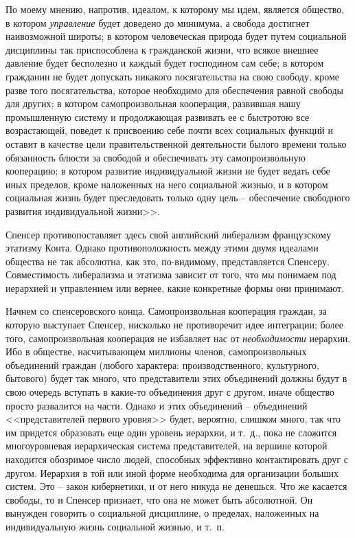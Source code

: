 \documentclass{book}
\begin{document}
По моему мнению, напротив, идеалом, к которому мы идем, является общество, в котором \textit{управление}  будет доведено до минимума, а свобода достигнет наивозможной широты; в ко­тором человеческая природа будет путем социальной дисцип­лины так приспособлена к гражданской жизни, что всякое внешнее давление будет бесполезно и каждый будет господи­ном сам себе; в котором гражданин не будет допускать ника­кого посягательства на свою свободу, кроме разве того пося­гательства, которое необходимо для обеспечения равной сво­боды для других; в котором самопроизвольная кооперация, развившая нашу промышленную систему и продолжающая раз­вивать ее с быстротою все возрастающей, поведет к присвоению себе почти всех социальных функций и оставит в качестве цели правительственной деятельности былого времени только обя­занность блюсти за свободой и обеспечивать эту самопроизволь­ную кооперацию; в котором развитие индивидуальной жизни не будет ведать себе иных пределов, кроме наложенных на не­го социальной жизнью, и в котором 
социальная жизнь будет преследовать только одну цель -- обеспечение свободного раз­вития индивидуальной жизни>>.

Спенсер противопоставляет здесь свой английский либера­лизм французскому этатизму Конта. Однако противополож­ность между этими двумя идеалами общества не так абсолютна, как это, по-видимому, представляется Спенсеру. Совместимость либерализма и этатизма зависит от того, что мы понимаем под иерархией и управлением или вернее, какие конкретные формы они принимают.

Начнем со спенсеровского конца. Самопроизвольная коопе­рация граждан, за которую выступает Спенсер, нисколько не противоречит идее интеграции; более того, самопроизвольная кооперация не избавляет нас от \textit{необходимости}  иерархии. Ибо в обществе, насчитывающем миллионы членов, самопроизволь­ных объединений граждан (любого характера: производствен­ного, культурного, бытового) будет так много, что предста­вители этих объединений должны будут в свою очередь всту­пать в какие-то объединения друг с другом, иначе общество просто развалится на части. Однако и этих объединений -- объе­динений <<представителей первого уровня>> будет, вероятно, слишком много, так что им придется образовать еще один уро­вень иерархии, и т.~д., пока не сложится многоуровневая иерар­хическая система представителей, на вершине которой находит­ся обозримое число людей, способных эффективно контакти­ровать друг с другом. Иерархия в той или иной форме необ­ходима для организации больших систем. Это -- закон кибер­нетики, и от него 
никуда не 
денешься. Что же касается свободы, то и Спенсер признает, что она не может быть абсолютной. Он вынужден говорить о социальной дисциплине, о пределах, наложенных на индивидуальную жизнь социальной жизнью, и т.~п.
\end{document}
